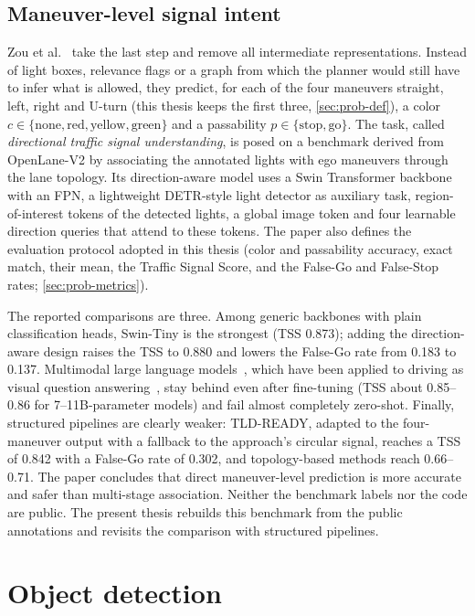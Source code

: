 \subsection{Maneuver-level signal intent}

Zou et al.~\cite{zou2026oneperception} take the last step and remove all intermediate
representations. Instead of light boxes, relevance flags or a graph from which the planner would still
have to infer what is allowed, they predict, for each of the four maneuvers straight, left, right and
U-turn (this thesis keeps the first three, \cref{sec:prob-def}), a color $c\in\{\text{none},\text{red},\text{yellow},\text{green}\}$ and a passability
$p\in\{\text{stop},\text{go}\}$. The task, called \emph{directional traffic signal understanding},
is posed on a benchmark derived from OpenLane-V2 by associating the annotated lights with ego
maneuvers through the lane topology. Its direction-aware model uses a Swin Transformer
backbone~\cite{liu2021swin} with an FPN, a lightweight
DETR-style light detector as auxiliary task, region-of-interest tokens of the detected lights, a global
image token and four learnable direction queries that attend to these tokens. The paper also defines
the evaluation protocol adopted in this thesis (color and passability accuracy, exact match, their
mean, the Traffic Signal Score, and the False-Go and False-Stop rates; \cref{sec:prob-metrics}).

The reported comparisons are three. Among generic backbones with plain classification heads, Swin-Tiny
is the strongest (TSS 0.873); adding the direction-aware design raises the TSS to 0.880 and lowers the
False-Go rate from 0.183 to 0.137. Multimodal large language models~\cite{liu2023visual}, which have
been applied to driving as visual question answering~\cite{sima2024drivelm}, stay behind even after
fine-tuning (TSS about 0.85--0.86 for 7--11B-parameter models) and fail almost completely zero-shot.
Finally, structured pipelines are clearly weaker: TLD-READY, adapted to the four-maneuver output with a
fallback to the approach's circular signal, reaches a TSS of 0.842 with a False-Go rate of 0.302, and
topology-based methods reach 0.66--0.71. The paper concludes that direct maneuver-level prediction is
more accurate and safer than multi-stage association. Neither the benchmark labels nor the code are
public. The present thesis rebuilds this benchmark from the public annotations and revisits the
comparison with structured pipelines.

\section{Object detection}
\label{sec:bg-detection}

